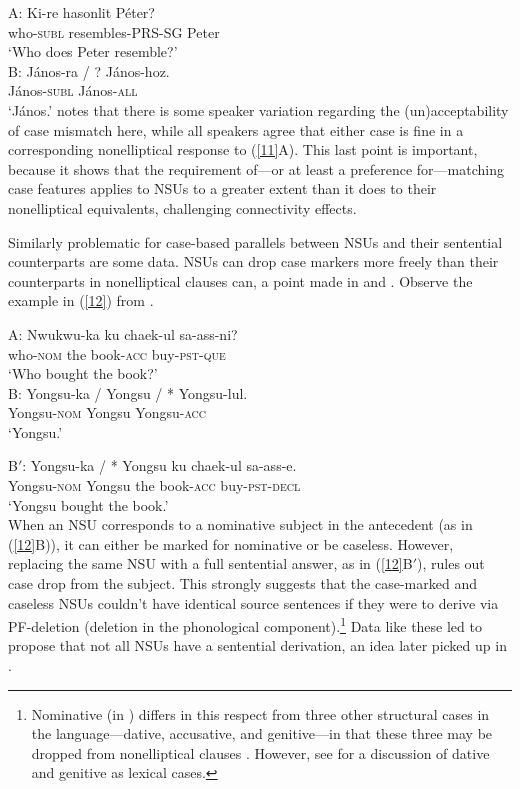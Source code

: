 \ea
A: \gll Ki-re             hasonlit         P\'{e}ter?\\
        who-\textsc{subl} resembles-PRS-SG Peter\\
   \glt  `Who does Peter resemble?'\\
B: \gll J\'{a}nos-ra / ? J\'{a}nos-hoz.\\
        J\'{a}nos-\textsc{subl} {} {} J\'{a}nos-\textsc{all}\\
\glt  `J\'{a}nos.'\label{11}
\z
%
\citet{Jacobson2016} notes that there is some speaker variation regarding the (un)ac\-cepta\-bi\-li\-ty of case mismatch here, while all speakers agree that either case is fine in a corresponding nonelliptical response to (\ref{11}A). This last point is important, because it shows that the requirement of---or at least a preference for---matching case features applies to NSUs to a greater extent than it does to their nonelliptical equivalents, challenging connectivity effects.

Similarly problematic for case-based parallels between NSUs and their sentential counterparts are some  data.  NSUs can drop case markers more freely than their counterparts in nonelliptical clauses can, a point made in \citet{Morgan1989} and \citet{Kim2015}. Observe the example in (\ref{12}) from \citet[237]{Morgan1989}.

  \ea
A: \gll Nwukwu-ka        ku  chaek-ul          sa-ass-ni?\\
        who-\textsc{nom} the book-\textsc{acc} buy-\textsc{pst}-\textsc{que}\\
\glt  `Who bought the book?'\\

B: \gll Yongsu-ka / Yongsu / * Yongsu-lul.\\
        Yongsu-\textsc{nom} {} Yongsu {} {} Yongsu-\textsc{acc}\\
\glt  `Yongsu.'

B$'$: \gll Yongsu-ka            /  *  Yongsu ku  chaek-ul          sa-ass-e.\\
           Yongsu-\textsc{nom}  {} {} Yongsu the book-\textsc{acc} buy-\textsc{pst}-\textsc{decl}\\
\glt  `Yongsu bought the book.'\\
\label{12}
\z
%
When an NSU  corresponds to a nominative subject in the antecedent (as in (\ref{12}B)), it can either be marked for nominative or be caseless.
However, replacing the same NSU  with a full sentential answer, as in (\ref{12}B$'$), rules out case drop from the subject. This strongly suggests that the case-marked and caseless NSUs couldn't have identical source sentences if they were to derive via PF-deletion (deletion in the phonological component).\footnote{Nominative (in ) differs in this respect from three other structural cases in the language---dative, accusative, and genitive---in that these three may be dropped from nonelliptical clauses \citep[see][]{Morgan1989, Lee2016, Kim2016}. However, see \citet{Mueller2002b} for a discussion of  dative and genitive as lexical cases.}  Data like these led \citet{Morgan1989} to propose that not all NSUs have a sentential derivation, an idea later picked up in \citet{Barton1998}.

